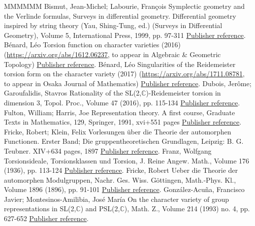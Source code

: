 \documentclass[11pt]{article}
\theoremstyle{definition}
\numberwithin{equation}{section}
\numberwithin{figure}{section}
\numberwithin{table}{section}
\begin{document}
\begin{thebibliography}{MMMMMM}
 Bismut, Jean-Michel; Labourie, François Symplectic geometry and the Verlinde formulas, Surveys in differential geometry. Differential geometry inspired by string theory (Yau, Shing-Tung, ed.) (Surveys in Differential Geometry), Volume 5, International Press, 1999, pp. 97-311 \href{https://ahl.centre-mersenne.org/item/AHL_2020__3__341_0/#BL}{Publisher reference}.
 Bénard, Léo Torsion function on character varieties (2016) (\url{https://arxiv.org/abs/1612.06237,} to appear in Algebraic \& Geometric Topology) \href{https://ahl.centre-mersenne.org/item/AHL_2020__3__341_0/#Benard2}{Publisher reference}.
 Bénard, Léo Singularities of the Reidemeister torsion form on the character variety (2017) (\url{https://arxiv.org/abs/1711.08781,} to appear in Osaka Journal of Mathematics) \href{https://ahl.centre-mersenne.org/item/AHL_2020__3__341_0/#Benard1}{Publisher reference}.
 Dubois, Jerôme; Garoufalidis, Stavros Rationality of the SL(2,\(\mathbb{C}\))-Reidemeister torsion in dimension 3, Topol. Proc., Volume 47 (2016), pp. 115-134 \href{https://ahl.centre-mersenne.org/item/AHL_2020__3__341_0/#DuboisGaroufalidis}{Publisher reference}.
 Fulton, William; Harris, Joe Representation theory. A first course, Graduate Texts in Mathematics, 129, Springer, 1991, xvi+551 pages \href{https://ahl.centre-mersenne.org/item/AHL_2020__3__341_0/#FultonHarris}{Publisher reference}.
 Fricke, Robert; Klein, Felix Vorlesungen über die Theorie der automorphen Functionen. Erster Band; Die gruppentheoretischen Grundlagen, Leipzig: B. G. Teubner. XIV+634 pages, 1897 \href{https://ahl.centre-mersenne.org/item/AHL_2020__3__341_0/#FrickeKlein}{Publisher reference}.
 Franz, Wolfgang Torsionsideale, Torsionsklassen und Torsion, J. Reine Angew. Math., Volume 176 (1936), pp. 113-124 \href{https://ahl.centre-mersenne.org/item/AHL_2020__3__341_0/#Franz37}{Publisher reference}.
 Fricke, Robert Ueber die Theorie der automorphen Modulgruppen, Nachr. Ges. Wiss. Göttingen, Math.-Phys. Kl., Volume 1896 (1896), pp. 91-101 \href{https://ahl.centre-mersenne.org/item/AHL_2020__3__341_0/#Fricke}{Publisher reference}.
 González-Acuña, Francisco Javier; Montesinos-Amilibia, José María On the character variety of group representations in SL(2,\(\mathbb{C}\)) and PSL(2,\(\mathbb{C}\)), Math. Z., Volume 214 (1993) no. 4, pp. 627-652 \href{https://ahl.centre-mersenne.org/item/AHL_2020__3__341_0/#AcunaMontesinos}{Publisher reference}.

\end{thebibliography}
\end{document}
